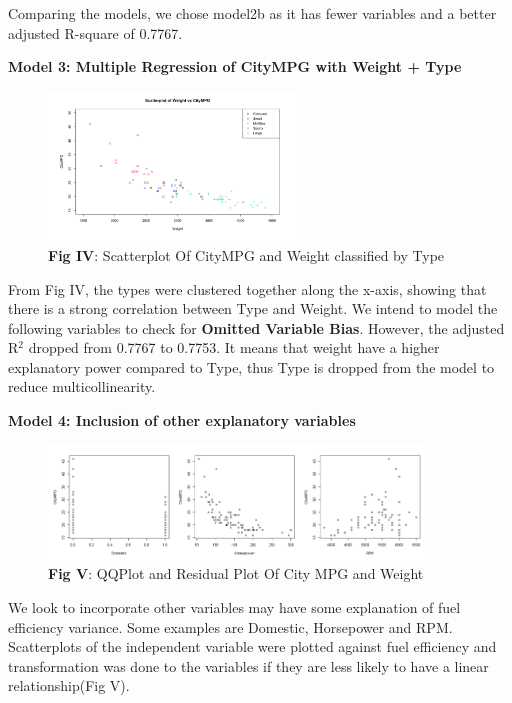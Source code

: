 \documentclass[12pt]{article}
\begin{document}
Comparing the models, we chose model2b as it has fewer variables and a better adjusted R-square of 0.7767.


\textbf{Model 3: Multiple Regression of CityMPG with Weight + Type} 
\begin{figure}[!htb]
	\begin{center}
	\includegraphics[width=0.6\textwidth]{ScatterplotType.png}
    \caption*{\textbf{Fig IV}:{ Scatterplot Of CityMPG and Weight classified by Type}}
	\end{center}
\end{figure}\newline
From Fig IV, the types were clustered together along the x-axis, showing that there is a strong correlation between Type and Weight. We intend to model the following variables to check for \textbf{Omitted Variable Bias}. However, the adjusted R$^{2}$ dropped from 0.7767 to 0.7753.  It means that weight have a higher explanatory power compared to Type, thus Type is dropped from the model to reduce multicollinearity. 



\textbf{Model 4: Inclusion of other explanatory variables } \newline
\begin{figure}[!htb]
	\caption*{\textbf{Fig V}:{ QQPlot and Residual Plot Of City MPG and Weight}}
	\begin{center}
	\includegraphics[width=0.9\textwidth]{Other_variables.png}
	\end{center}
\end{figure}

We look to incorporate other variables may have some explanation of fuel efficiency variance. 
Some examples are Domestic, Horsepower and RPM. Scatterplots of the independent variable were plotted against fuel efficiency and transformation was done to the variables if they are less likely to have a linear relationship(Fig V).
\end{document}
